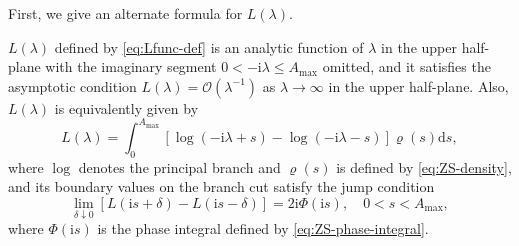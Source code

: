 \documentclass[12pt]{amsart}
\numberwithin{equation}{section}
\newcommand{\dd}{\mathrm{d}}
\newcommand{\ii}{\mathrm{i}}
\newcommand{\SP}{\lambda}
\newcommand{\phaseint}{\Phi}
\newcommand{\evdensity}{\varrho}
\newcommand{\bigo}[1]{ \mathcal{O}\! \left( #1 \right) }
\begin{document}
First, we give an alternate formula for $L(\SP)$.
\begin{lem}
$L(\SP)$ defined by \eqref{eq:Lfunc-def} is an analytic function of $\SP$ in the upper half-plane with the imaginary segment $0<-\ii\SP\le A_\mathrm{max}$ omitted, and it satisfies the asymptotic condition $L(\SP)=\bigo{\SP^{-1}}$ as $\SP\to\infty$ in the upper half-plane.  Also, $L(\SP)$ is equivalently given by
\begin{equation}
L(\SP)=\int_0^{A_\mathrm{max}}\left[\log(-\ii\SP+s)-\log(-\ii\SP-s)\right]\evdensity(s)\dd s,
\label{eq:ZS-nu0hat}
\end{equation}
where $\log$ denotes the principal branch and $\evdensity(s)$ is defined by \eqref{eq:ZS-density}, and its boundary values on the branch cut satisfy the jump condition 
\begin{equation}
\lim_{\delta\downarrow 0}\left[L(\ii s+\delta)-L(\ii s-\delta)\right]=2\ii\phaseint(\ii s),\quad 0<s<A_\mathrm{max},
\label{eq:ZS-nu0-jump}
\end{equation}
where $\phaseint(\ii s)$ is the phase integral defined by \eqref{eq:ZS-phase-integral}.
\label{lem:L-alternate}
\end{lem}
\end{document}
